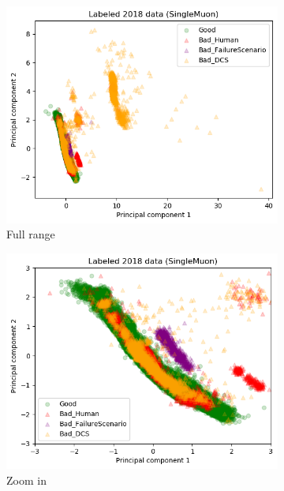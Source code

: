 \begin{figure}[h!]
\centering
    \begin{subfigure}[b]{0.49\linewidth}
        \includegraphics[width=\linewidth]{images/reco/2018/SingleMuon_label_separate.png}
        \caption{Full range}
    \end{subfigure}
    \begin{subfigure}[b]{0.49\linewidth}
        \includegraphics[width=\linewidth]{images/reco/2018/SingleMuon_label_separate_short_range.png}
        \caption{Zoom in}
    \end{subfigure}
    \begin{subfigure}[b]{0.49\linewidth}

\end{subfigure}
\end{figure}
